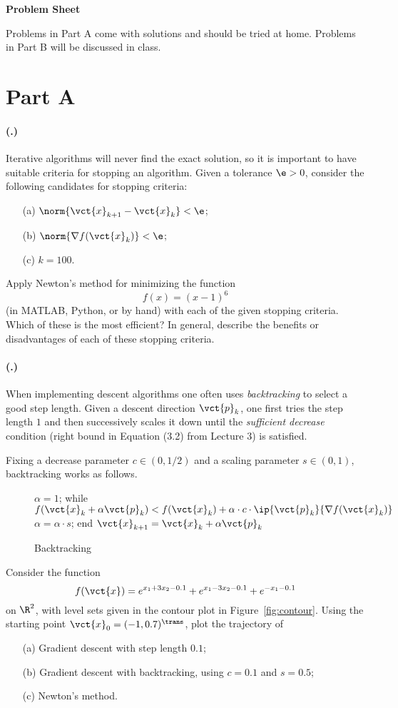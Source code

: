 \documentclass{article}
\newcounter{problemSheetNumber}
\newcounter{problems}
\renewcommand{\problem}{\paragraph{(\theproblemSheetNumber.\theproblems)}\addtocounter{problems}{1}}
\begin{document}
 
\begin{center}
{\Large {\bf Problem Sheet \theproblemSheetNumber}}
\end{center}

Problems in Part A come with solutions and should be tried at home. Problems in Part B will be discussed in class.

\section*{Part A}

\problem Iterative algorithms will never find the exact solution, so it is important to have suitable criteria for stopping an algorithm. Given a tolerance $\e>0$, consider the following candidates for stopping criteria:
\begin{itemize}
 \item[(a)] $\norm{\vct{x}_{k+1}-\vct{x}_k}<\e$;
 \item[(b)] $\norm{\nabla f(\vct{x}_k)}<\e$;
 \item[(c)] $k=100$.
\end{itemize}
Apply Newton's method for minimizing the function
\begin{equation*}
 f(x) = (x-1)^6
\end{equation*}
(in MATLAB, Python, or by hand) with each of the given stopping criteria. Which of these is the most efficient? In general, describe the benefits or disadvantages of each of these stopping criteria. 

\problem When implementing descent algorithms one often uses {\em backtracking} to select a good step length. Given a descent direction $\vct{p}_k$, one first tries the step length $1$ and then successively scales it down until the {\em sufficient decrease} condition (right bound in Equation (3.2) from Lecture 3) is satisfied.

Fixing a decrease parameter $c\in (0,1/2)$ and a scaling parameter $s\in (0,1)$, backtracking works as follows.
\begin{figure}[h!]
\begin{PseudoCode}
 $\alpha=1$;
 while $f(\vct{x}_k+\alpha \vct{p}_k)<f(\vct{x}_k)+\alpha \cdot c\cdot \ip{\vct{p}_k}{\nabla f(\vct{x}_k)}$
     $\displaystyle \alpha = \alpha\cdot s$;
 end
 $\displaystyle \vct{x}_{k+1} = \vct{x}_k+\alpha \vct{p}_k$
\end{PseudoCode}
\caption{Backtracking}
\end{figure}

Consider the function
\begin{equation*}
 f(\vct{x}) = e^{x_1+3x_2-0.1}+e^{x_1-3x_2-0.1}+e^{-x_1-0.1}
\end{equation*}
on $\R^2$, with level sets given in the contour plot in Figure~\ref{fig:contour}.
Using the starting point $\vct{x}_0=(-1,0.7)^{\trans}$, plot the trajectory of
\begin{itemize}
 \item[(a)] Gradient descent with step length $0.1$;
 \item[(b)] Gradient descent with backtracking, using $c=0.1$ and $s=0.5$;
 \item[(c)] Newton's method.
\end{itemize}
\end{document}
